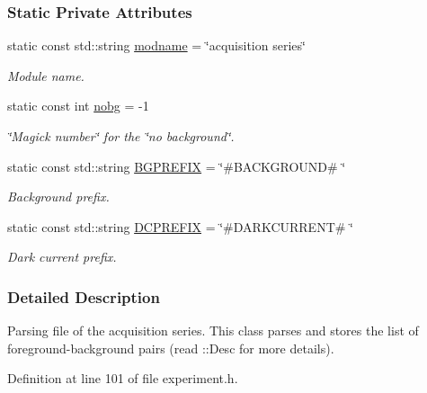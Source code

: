 \subsubsection*{Static Private Attributes}
\begin{DoxyCompactItemize}
\item 
static const std::string \hyperlink{classAqSeries_a0b757fedd7bbbd264e301ee4e8d96b7d}{modname} = \char`\"{}acquisition series\char`\"{}
\begin{DoxyCompactList}\small\item\em Module name. \item\end{DoxyCompactList}\item 
static const int \hyperlink{classAqSeries_aa52b4d6b06f4f139eba2e89c74f2b0cb}{nobg} = -\/1
\begin{DoxyCompactList}\small\item\em \char`\"{}Magick number\char`\"{} for the \char`\"{}no background\char`\"{}. \item\end{DoxyCompactList}\item 
static const std::string \hyperlink{classAqSeries_ab59cfbac5b616df2cf8e334d91800c84}{BGPREFIX} = \char`\"{}\#BACKGROUND\# \char`\"{}
\begin{DoxyCompactList}\small\item\em Background prefix. \item\end{DoxyCompactList}\item 
static const std::string \hyperlink{classAqSeries_a9174813ea5229d0b21bff04794baf499}{DCPREFIX} = \char`\"{}\#DARKCURRENT\# \char`\"{}
\begin{DoxyCompactList}\small\item\em Dark current prefix. \item\end{DoxyCompactList}\end{DoxyCompactItemize}


\subsubsection{Detailed Description}
Parsing file of the acquisition series. This class parses and stores the list of foreground-\/background pairs (read ::Desc for more details). 

Definition at line 101 of file experiment.h.



